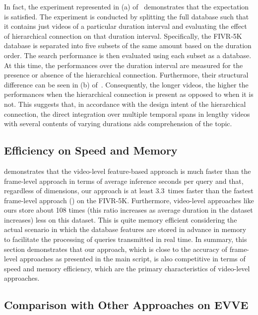 \documentclass[10pt,twocolumn,letterpaper]{article}
\begin{document}
        In fact, the experiment represented in (a) of~ demonstrates that the expectation is satisfied. The experiment is conducted by splitting the full database such that it contains just videos of a particular duration interval and evaluating the effect of hierarchical connection on that duration interval. Specifically, the FIVR-5K database is separated into five subsets of the same amount based on the duration order. The search performance is then evaluated using each subset as a database. At this time, the performances over the duration interval are measured for the presence or absence of the hierarchical connection. Furthermore, their structural difference can be seen in (b) of~. Consequently, the longer videos, the higher the performances when the hierarchical connection is present as opposed to when it is not. This suggests that, in accordance with the design intent of the hierarchical connection, the direct integration over multiple temporal spans in lengthy videos with several contents of varying durations aids comprehension of the topic.


    

    

    
    \subsection{Efficiency on Speed and Memory} \label{speed_memory}
         demonstrates that the video-level feature-based approach is much faster than the frame-level approach in terms of average inference seconds per query and that, regardless of dimensions, our approach is at least 3.3~times faster than the fastest frame-level approach () on the FIVR-5K. Furthermore, video-level approaches like ours store about 108 times (this ratio increases as average duration in the dataset increases) less on this dataset. This is quite memory efficient considering the actual scenario in which the database features are stored in advance in memory to facilitate the processing of queries transmitted in real time. In summary, this section demonstrates that our approach, which is close to the accuracy of frame-level approaches as presented in the main script, is also competitive in terms of speed and memory efficiency, which are the primary characteristics of video-level approaches.


    
    \subsection{Comparison with Other Approaches on EVVE} \label{bench_evve}
\end{document}
